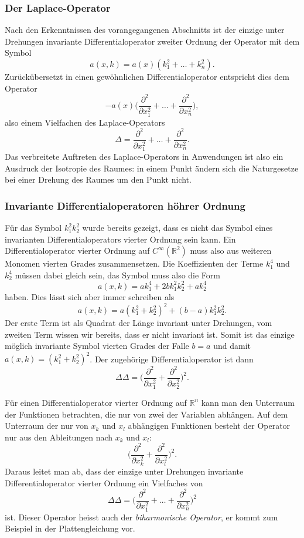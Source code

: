 %
%
\subsubsection{Der Laplace-Operator}
Nach den Erkenntnissen des vorangegangenen Abschnitts ist der einzige
unter Drehungen invariante Differentialoperator zweiter Ordnung der 
Operator mit dem Symbol
\[
a(x,k) 
=
a(x)(k_1^2+\dots+k_n^2).
\]
Zurückübersetzt in einen gewöhnlichen Differentialoperator entspricht
dies dem Operator
\[
-a(x)
\biggl(
\frac{\partial^2}{\partial x_1^2}
+
\dots
+
\frac{\partial^2}{\partial x_n^2}
\biggr)
,
\]
also einem Vielfachen des Laplace-Operators
\[
\Delta
=
\frac{\partial^2}{\partial x_1^2}
+
\dots
+
\frac{\partial^2}{\partial x_n^2}.
\]
Das verbreitete Auftreten des Laplace-Operators in Anwendungen ist
also ein Ausdruck der Isotropie des Raumes: in einem Punkt ändern sich
die Naturgesetze bei einer Drehung des Raumes um den Punkt nicht.

%
%
\subsubsection{Invariante Differentialoperatoren höhrer Ordnung}
Für das Symbol $k_1^2k_2^2$ wurde bereits gezeigt, dass es nicht das Symbol
eines invarianten Differentialoperators vierter Ordnung sein kann.
Ein Differentialoperator vierter Ordnung auf $C^\infty(\mathbb{R}^2)$
muss also aus weiteren Monomen vierten Grades zusammensetzen.
Die Koeffizienten der Terme $k_1^4$ und $k_2^4$ müssen dabei gleich
sein, das Symbol muss also die Form
\[
a(x,k)
=
ak_1^4 + 2bk_1^2k_2^2 + ak_2^4
\]
haben.
Dies lässt sich aber immer schreiben als
\[
a(x,k)
=
a(k_1^2+k_2^2)^2 + (b-a)k_1^2k_2^2.
\]
Der erste Term ist als Quadrat der Länge invariant unter Drehungen,
vom zweiten Term wissen wir bereits, dass er nicht invariant ist.
Somit ist das einzige möglich invariante Symbol vierten Grades
der Falle $b=a$ und damit  $a(x,k) = (k_1^2+k_2^2)^2$.
Der zugehörige Differentialoperator ist dann 
\[
\Delta \Delta
=
\biggl(
\frac{\partial^2}{\partial x_1^2}
+
\frac{\partial^2}{\partial x_2^2}
\biggr)^2.
\]

Für einen Differentialoperator vierter Ordnung auf $\mathbb{R}^n$ kann
man den Unterraum der Funktionen betrachten, die nur von zwei der
Variablen abhängen.
Auf dem Unterraum der nur von $x_k$ und $x_l$ abhängigen Funktionen
besteht der Operator nur aus den Ableitungen
nach $x_k$ und $x_l$:
\[
\biggl(
\frac{\partial^2}{\partial x_k^2}
+
\frac{\partial^2}{\partial x_l^2}
\biggr)^2.
\]
Daraus leitet man ab, dass der einzige unter Drehungen invariante
Differentialoperator vierter Ordnung ein Vielfaches von
\[
\Delta\Delta 
=
\biggl(
\frac{\partial^2}{\partial x_1^2}
+
\dots
+
\frac{\partial^2}{\partial x_n^2}
\biggr)^2
\]
ist.
Dieser Operator heisst auch der {\em biharmonische Operator}, er
%
%
kommt zum Beispiel in der Plattengleichung vor.

